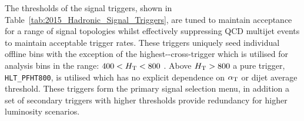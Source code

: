 The thresholds of the signal triggers, shown in Table~\ref{tab:2015_Hadronic_Signal_Triggers}, are 
tuned to maintain acceptance for a range of signal topologies whilst effectively suppressing QCD 
multijet events to maintain acceptable trigger rates. These triggers uniquely seed individual offline \scalht 
bins with the exception of the highest-\scalht \scalht-\alphat cross-trigger which is utilised for analysis 
bins in the range: 
$400 < \mbox{$H_\text{T}$} < 800$ \GeV. Above $\mbox{$H_\text{T}$} > 800$ a pure \scalht trigger, \verb!HLT_PFHT800!, is utilised 
which has no explicit dependence on $\alpha_{\text{T}}$ or dijet average threshold. These triggers form the primary 
signal selection menu, in addition a set of secondary triggers with higher \alphat thresholds provide redundancy 
for higher luminosity scenarios. 

